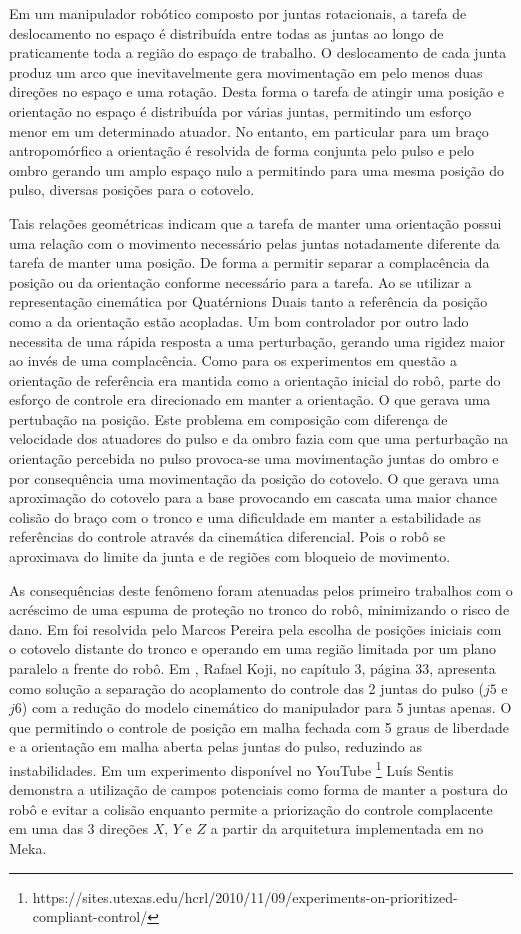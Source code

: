 Em um manipulador robótico composto por juntas rotacionais, a tarefa de deslocamento no espaço é distribuída entre todas as juntas ao longo de praticamente toda a região do espaço de trabalho. O deslocamento de cada junta produz um arco que inevitavelmente gera movimentação em pelo menos duas direções no espaço e uma rotação. Desta forma o tarefa de atingir uma posição e orientação no espaço é distribuída por várias juntas, permitindo um esforço menor em um determinado atuador. No entanto, em particular para um braço antropomórfico a orientação é resolvida de forma conjunta pelo pulso e pelo ombro gerando um amplo espaço nulo a permitindo para uma mesma posição do pulso, diversas posições para o cotovelo.

Tais relações geométricas indicam que a tarefa de manter uma orientação possui uma relação com o movimento necessário pelas juntas notadamente diferente da tarefa de manter uma posição. De forma a permitir separar a complacência da posição ou da orientação conforme necessário para a tarefa. Ao se utilizar a representação cinemática por Quatérnions Duais tanto a referência da posição como a da orientação estão acopladas. Um bom controlador por outro lado necessita de uma rápida resposta a uma perturbação, gerando uma rigidez maior ao invés de uma complacência. Como para os experimentos em questão a orientação de referência era mantida como a orientação inicial do robô, parte do esforço de controle era direcionado em manter a orientação. O que gerava uma pertubação na posição. Este problema em composição com diferença de velocidade dos atuadores do pulso e da ombro fazia com que uma perturbação na orientação percebida no pulso provoca-se uma movimentação juntas do ombro e por consequência uma movimentação da posição do cotovelo. O que gerava uma aproximação do cotovelo para a base provocando em cascata uma maior chance colisão do braço com o tronco e uma dificuldade em manter a estabilidade as referências do controle através da cinemática diferencial. Pois o robô se aproximava do limite da junta e de regiões com bloqueio de movimento.

As consequências deste fenômeno foram atenuadas pelos primeiro trabalhos com o acréscimo de uma espuma de proteção no tronco do robô, minimizando o risco de dano. Em \cite{marcosps2016} foi resolvida pelo Marcos Pereira pela escolha de posições iniciais com o cotovelo distante do tronco e operando em uma região limitada por um plano paralelo a frente do robô. Em \cite{koji2017}, Rafael Koji, no capítulo 3, página 33, apresenta como solução a separação do acoplamento do controle das 2 juntas do pulso ($j5$ e $j6$) com a redução do modelo cinemático do manipulador para 5 juntas apenas. O que permitindo o controle de posição em malha fechada com 5 graus de liberdade e a orientação em malha aberta pelas juntas do pulso, reduzindo as instabilidades. Em um experimento disponível no YouTube \footnote{https://sites.utexas.edu/hcrl/2010/11/09/experiments-on-prioritized-compliant-control/} Luís Sentis demonstra a utilização de campos potenciais como forma de manter a postura do robô e evitar a colisão enquanto permite a priorização do controle complacente em uma das 3 direções $X$, $Y$ e $Z$ a partir da arquitetura implementada em \cite{sentis2007synthesis} no Meka.

